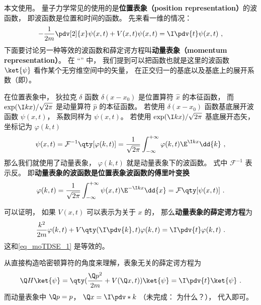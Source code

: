 

本文使用。 量子力学常见的使用的是\textbf{位置表象（position representation）}的波函数， 即波函数是位置和时间的函数。 先来看一维的情况：
\begin{equation}\label{eq_moTDSE_1}
-\frac{1}{2m} \pdv[2]{x}\psi(x, t) + V(x,t)\psi(x,t) = \I \pdv{t} \psi(x,t)~,
\end{equation}
下面要讨论另一种等效的波函数和薛定谔方程叫\textbf{动量表象（momentum representation）}。 在 “” 中， 我们提到可以把函数也就是这里的波函数 $\ket{\psi}$ 看作某个无穷维空间中的矢量， 在正交归一的基底以及基底上的展开系数（即）。

在位置表象中， 狄拉克 $\delta$ 函数 $\delta(x-x_0)$ 是位置算符 $\hat x$ 的本征函数， 而 $\exp(\I kx)/\sqrt{2\pi}$ 是动量算符 $\hat p$ 的本征函数。 若使用 $\delta(x-x_0)$ 函数基底展开波函数 $\psi(x, t)$， 系数同样为 $\psi(x, t)$。 若使用 $\exp(\I kx)/\sqrt{2\pi}$ 基底展开态矢， 坐标记为 $\varphi(k, t)$
\begin{equation}\label{eq_moTDSE_2}
\psi(x,t) = \mathcal{F}^{-1} \qty[\varphi(k,t)] = \frac{1}{\sqrt{2\pi}}\int_{-\infty}^{+\infty} \varphi(k,t)\E^{\I kx}\dd{k} ~,
\end{equation}
那么我们就使用了动量表象， $\varphi(k, t)$ 就是动量表象下的波函数。 式中 $\mathcal{F}^{-1}$ 表示反。 即\textbf{动量表象的波函数是位置表象波函数的傅里叶变换}
\begin{equation}
\varphi(k,t) = \frac{1}{\sqrt{2\pi}}\int_{-\infty}^{+\infty} \psi(x,t)\E^{-\I kx}\dd{x} = \mathcal{F}\qty[\psi(x, t)]~.
\end{equation}

可以证明， 如果 $V(x,t)$ 可以表示为关于 $x$ 的， 那么\textbf{动量表象的薛定谔方程}为
\begin{equation}\label{eq_moTDSE_3}
\frac{k^2}{2m}\varphi(k, t) + V\qty(\I \pdv{k}, t)\varphi(k, t) = \I \pdv{t} \varphi(k,t)~.
\end{equation}
这和\autoref{eq_moTDSE_1} 是等效的。

从直接构造哈密顿算符的角度来理解，表象无关的薛定谔方程为
\begin{equation}
\Q H\ket{\psi} = \qty(\frac{\Q p^2}{2m} + V(\Q x, t))\ket{\psi} = \I \pdv{t}\ket{\psi}~.
\end{equation}
而动量表象中 $\Q p = p$， $\Q x  = \I \pdv*{k}$ （未完成： 为什么？）， 代入即可。

